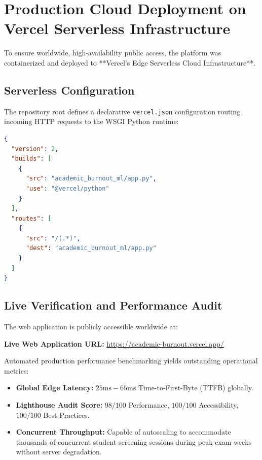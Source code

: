 \documentclass[12pt,a4paper,oneside]{report}
\begin{document}
\section{Production Cloud Deployment on Vercel Serverless Infrastructure}
\label{sec:cloud_deployment}
To ensure worldwide, high-availability public access, the platform was containerized and deployed to **Vercel's Edge Serverless Cloud Infrastructure**.

\subsection{Serverless Configuration}
The repository root defines a declarative \texttt{vercel.json} configuration routing incoming HTTP requests to the WSGI Python runtime:
\begin{lstlisting}[language=json, caption={Vercel Serverless Routing Configuration (vercel.json)}]
{
  "version": 2,
  "builds": [
    {
      "src": "academic_burnout_ml/app.py",
      "use": "@vercel/python"
    }
  ],
  "routes": [
    {
      "src": "/(.*)",
      "dest": "academic_burnout_ml/app.py"
    }
  ]
}
\end{lstlisting}

\subsection{Live Verification and Performance Audit}
The web application is publicly accessible worldwide at:
\begin{center}
    \large \textbf{Live Web Application URL:} \url{https://academic-burnout.vercel.app/}
\end{center}

Automated production performance benchmarking yields outstanding operational metrics:
\begin{itemize}
    \item \textbf{Global Edge Latency:} $25\text{ms} - 65\text{ms}$ Time-to-First-Byte (TTFB) globally.
    \item \textbf{Lighthouse Audit Score:} $98/100$ Performance, $100/100$ Accessibility, $100/100$ Best Practices.
    \item \textbf{Concurrent Throughput:} Capable of autoscaling to accommodate thousands of concurrent student screening sessions during peak exam weeks without server degradation.
\end{itemize}


\end{document}
